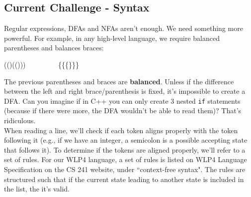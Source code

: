 \documentclass{report}
\begin{document}
\subsection{Current Challenge - Syntax}
Regular expressions, DFAs and NFAs aren't enough. We need something more powerful. For example, in any high-level language, we require balanced parentheses and balances braces:
\begin{center}
(()(())) $\qquad\qquad$ \{\{\{\}\}\}
\end{center}
The previous parentheses and braces are \textbf{balanced}. Unless if the difference between the left and right brace/parenthesis is fixed, it's impossible to create a DFA. Can you imagine if in C++ you can only create 3 nested \texttt{if} statements (because if there were more, the DFA wouldn't be able to read them)? That's ridiculous.\\When reading a line, we'll check if each token aligns properly with the token following it (e.g., if we have an integer, a semicolon is a possible accepting state that follows it). To determine if the tokens are aligned properly, we'll refer to a set of rules. For our WLP4 language, a set of rules is listed on WLP4 Language Specification  on the CS 241 website, under ``context-free syntax". The rules are structured such that if the current state leading to another state is included in the list, the it's valid. 
\end{document}
